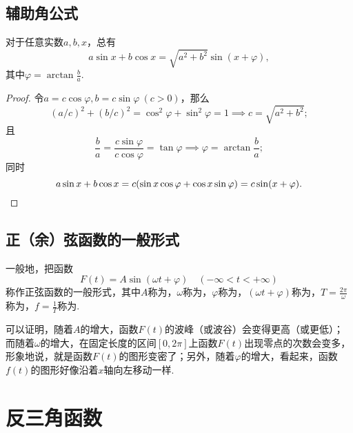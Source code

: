 \subsection{辅助角公式}
\begin{theorem}[辅助角公式]
对于任意实数\(a,b,x\)，总有
\begin{equation}
a \sin x + b \cos x = \sqrt{a^2 + b^2} \sin(x + \varphi),
\end{equation}
其中\(\varphi = \arctan\frac{b}{a}\).
\begin{proof}
令\(a = c \cos\varphi,
b = c \sin\varphi\ (c>0)\)，那么
\[
\left(a/c\right)^2+\left(b/c\right)^2
=\cos^2\varphi+\sin^2\varphi
=1
\implies
c = \sqrt{a^2+b^2};
\]
且\[
\frac{b}{a} = \frac{c \sin\varphi}{c \cos\varphi} = \tan\varphi
\implies
\varphi = \arctan\frac{b}{a};
\]
同时
\[
a \sin x + b \cos x
= c (\sin x \cos\varphi + \cos x \sin\varphi)
= c \sin(x+\varphi).
\qedhere
\]
\end{proof}
\end{theorem}

\subsection{正（余）弦函数的一般形式}
\begin{definition}
一般地，把函数\[
F(t) = A \sin(\omega t + \varphi) \quad (-\infty<t<+\infty)
\]称作正弦函数的一般形式，其中\(A\)称为，\(\omega\)称为，\(\varphi\)称为，\((\omega t + \varphi)\)称为，\(T = \frac{2\pi}{\omega}\)称为，\(f = \frac{1}{T}\)称为.
\end{definition}
可以证明，随着\(A\)的增大，函数\(F(t)\)的波峰（或波谷）会变得更高（或更低）；而随着\(\omega\)的增大，在固定长度的区间\([0,2\pi]\)上函数\(F(t)\)出现零点的次数会变多，形象地说，就是函数\(F(t)\)的图形变密了；另外，随着\(\varphi\)的增大，看起来，函数\(f(t)\)的图形好像沿着\(x\)轴向左移动一样.

\section{反三角函数}
